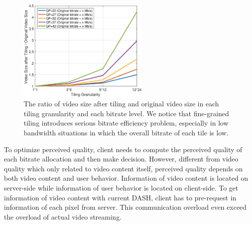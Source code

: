 \begin{figure}
  \centering
  \includegraphics[width=2.5in]{images/bitrateefficiency.eps}
  \caption{The ratio of video size after tiling and original video size in each tiling granularity and each bitrate level. We notice that fine-grained tiling introduces serious bitrate efficiency problem, especially in low bandwidth situations in which the overall bitrate of each tile is low.}
  \label{bitrateefficiency}
  \end{figure}

To optimize perceived quality, client needs to compute the perceived quality of each bitrate allocation and then make decision. However, different from video quality which only related to video content itself, perceived quality depends on both video content and user behavior. Information of video content is located on server-side while information of user behavior is located on client-side. To get information of video content with current DASH, client has to pre-request in information of each pixel from server. This communication overload even exceed the overload of actual video streaming.



